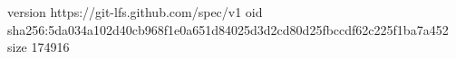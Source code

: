 version https://git-lfs.github.com/spec/v1
oid sha256:5da034a102d40cb968f1e0a651d84025d3d2cd80d25fbccdf62c225f1ba7a452
size 174916
